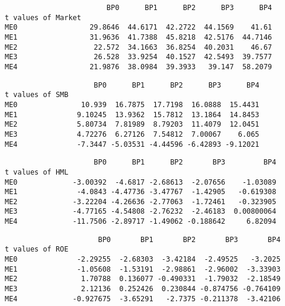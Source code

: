 \documentclass[11pt]{article}
\begin{document}
    
    \begin{verbatim}
                        BP0      BP1      BP2      BP3      BP4
t values of Market                                             
ME0                 29.8646  44.6171  42.2722  44.1569    41.61
ME1                 31.9636  41.7388  45.8218  42.5176  44.7146
ME2                  22.572  34.1663  36.8254  40.2031    46.67
ME3                  26.528  33.9254  40.1527  42.5493  39.7577
ME4                 21.9876  38.0984  39.3933   39.147  58.2079
    \end{verbatim}

    
    
    \begin{verbatim}
                     BP0      BP1      BP2      BP3      BP4
t values of SMB                                             
ME0               10.939  16.7875  17.7198  16.0888  15.4431
ME1              9.10245  13.9362  15.7812  13.1864  14.8453
ME2              5.80734  7.81989  8.79203  11.4079  12.0451
ME3              4.72276  6.27126  7.54812  7.00067    6.065
ME4              -7.3447 -5.03531 -4.44596 -6.42893 -9.12021
    \end{verbatim}

    
    
    \begin{verbatim}
                     BP0      BP1      BP2       BP3         BP4
t values of HML                                                 
ME0             -3.00392  -4.6817 -2.68613  -2.07656    -1.03089
ME1              -4.0843 -4.47736 -3.47767  -1.42905   -0.619308
ME2             -3.22204 -4.26636 -2.77063  -1.72461   -0.323905
ME3             -4.77165 -4.54808 -2.76232  -2.46183  0.00800064
ME4             -11.7506 -2.89717 -1.49062 -0.188642     6.82094
    \end{verbatim}

    
    
    \begin{verbatim}
                      BP0       BP1       BP2       BP3       BP4
t values of ROE                                                  
ME0              -2.29255  -2.68303  -3.42184  -2.49525   -3.2025
ME1              -1.05608  -1.53191  -2.98861  -2.96002  -3.33903
ME2               1.70788  0.136077 -0.490331  -1.79032  -2.18549
ME3               2.12136  0.252426  0.230844 -0.874756 -0.764109
ME4             -0.927675  -3.65291   -2.7375 -0.211378  -3.42106
    \end{verbatim}

    
    
\end{document}
